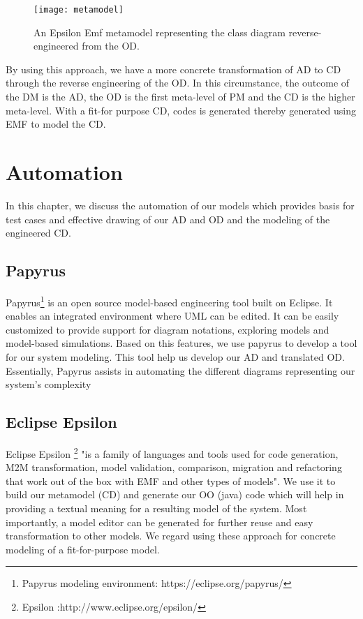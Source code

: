 \documentclass[10pt]{article}
\begin{document}
\begin{figure}[!ht]
  \centering
   \texttt{[image: metamodel]}
  \caption{An Epsilon Emf metamodel representing the class diagram reverse-engineered from the OD.}
  \label{fig:metamodel}
\end{figure}
By using this approach, we have a more concrete transformation of AD to CD through the reverse engineering of the OD. In this circumstance, the outcome of the DM is the AD, the OD is the first meta-level of PM and the CD is the higher meta-level. With a fit-for purpose CD, codes is generated thereby generated using EMF to model the CD. 

\section{Automation}
In this chapter, we discuss the automation of our models which provides basis for test cases and effective drawing of our AD and OD and the modeling of the engineered CD.
\subsection{Papyrus}
Papyrus\footnote{Papyrus modeling environment: https://eclipse.org/papyrus/} is an open source model-based engineering tool built on Eclipse. It enables an integrated environment where UML can be edited. It can be easily customized to provide support for diagram notations, exploring models and model-based simulations. Based on this features, we use papyrus to develop a tool for our system modeling. This tool help us develop our AD and translated OD. Essentially, Papyrus assists in automating the different diagrams representing our system’s complexity

\subsection{Eclipse Epsilon}
Eclipse Epsilon \footnote{Epsilon :http://www.eclipse.org/epsilon/} "is a family of languages and tools used for code generation, M2M transformation, model validation, comparison, migration and refactoring that work out of the box with EMF and other types of models". We use it to build our metamodel (CD) and generate our OO (java) code which will help in providing a textual meaning for a resulting model of the system. Most importantly, a model editor can be generated for further reuse and easy transformation to other models. We regard using these approach for concrete modeling of a fit-for-purpose model.
\end{document}
